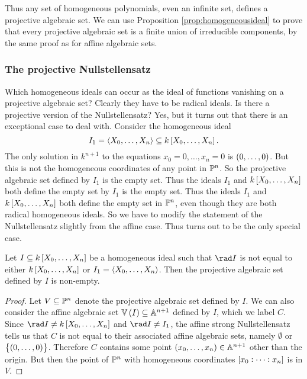 Thus any set of homogeneous polynomials, even an infinite set, defines a projective algebraic set. We can use Proposition \ref{prop:homogeneousideal} to prove that every projective algebraic set is a finite union of irreducible components, by the same proof as for affine algebraic sets.

\subsubsection{The projective Nullstellensatz}


Which homogeneous ideals can occur as the ideal of functions vanishing on a projective algebraic set? Clearly they have to be radical ideals. Is there a projective version of the Nullstellensatz? Yes, but it turns out that there is an exceptional case to deal with. Consider the homogeneous ideal
$$ I_1 = \abr{X_0, \dots, X_n} \subseteq k\sbr{X_0, \dots, X_n}. $$
The only solution in $ k^{n + 1} $ to the equations $ x_0 = 0, \dots, x_n = 0 $ is $ \br{0, \dots, 0} $. But this is not the homogeneous coordinates of any point in $ \mathbb{P}^n $. So the projective algebraic set defined by $ I_1 $ is the empty set. Thus the ideals $ I_1 $ and $ k\sbr{X_0, \dots, X_n} $ both define the empty set by $ I_1 $ is the empty set. Thus the ideals $ I_1 $ and $ k\sbr{X_0, \dots, X_n} $ both define the empty set in $ \mathbb{P}^n $, even though they are both radical homogeneous ideals. So we have to modify the statement of the Nullstellensatz slightly from the affine case. Thus turns out to be the only special case.

\pagebreak

\begin{proposition}
Let $ I \subseteq k\sbr{X_0, \dots, X_n} $ be a homogeneous ideal such that $ \rad I $ is not equal to either $ k\sbr{X_0, \dots, X_n} $ or $ I_1 = \left\langle X_0, \dots, X_n \right\rangle $. Then the projective algebraic set defined by $ I $ is non-empty.
\end{proposition}

\begin{proof}
Let $ V \subseteq \mathbb{P}^n $ denote the projective algebraic set defined by $ I $. We can also consider the affine algebraic set $ \VV\br{I} \subseteq \AA^{n + 1} $ defined by $ I $, which we label $ C $. Since $ \rad I \ne k\sbr{X_0, \dots, X_n} $ and $ \rad I \ne I_1 $, the affine strong Nullstellensatz tells us that $ C $ is not equal to their associated affine algebraic sets, namely $ \emptyset $ or $ \cbr{\br{0, \dots, 0}} $. Therefore $ C $ contains some point $ \br{x_0, \dots, x_n} \in \AA^{n + 1} $ other than the origin. But then the point of $ \mathbb{P}^n $ with homogeneous coordinates $ \sbr{x_0 : \dots : x_n} $ is in $ V $.
\end{proof}

